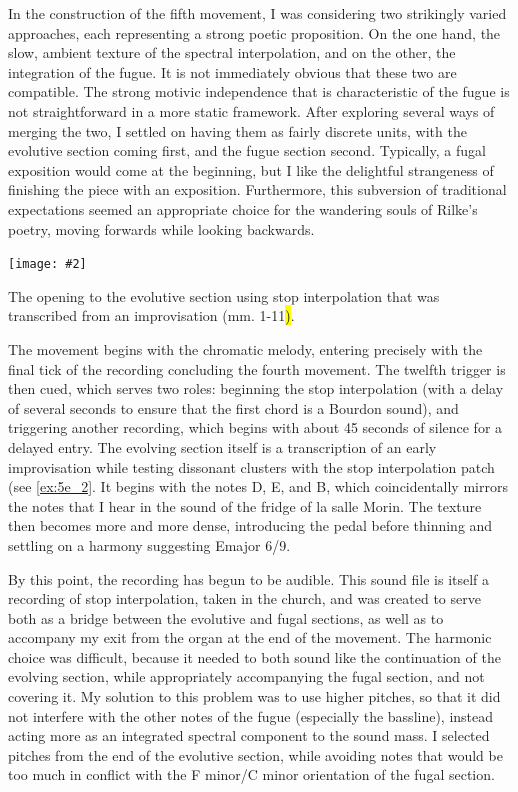 \documentclass[12pt,twoside,maitrise]{dms_ks}
\newcommand{\customincludeexamples}[4][]{%
    \begin{example}[H]
        \centering
        \texttt{[image: \#2]}
        \caption{#4}
	\label{#3} 
    \end{example}
}
\theoremstyle{definition}
\begin{document}
{{In the construction of the fifth movement, I was considering two strikingly varied approaches, each representing a strong poetic proposition. 
On the one hand, the slow, ambient texture of the spectral interpolation, and on the other, the integration of the fugue. 
It is not immediately obvious that these two are compatible.
The strong motivic independence that is characteristic of the fugue is not straightforward in a more static framework.
After exploring several ways of merging the two, I settled on having them as fairly discrete units, with the evolutive section coming first, and the fugue section second. 
Typically, a fugal exposition would come at the beginning, but I like the delightful strangeness of finishing the piece with an exposition. 
Furthermore, this subversion of traditional expectations seemed an appropriate choice for the wandering souls of Rilke's poetry, moving forwards while looking backwards. 

\customincludeexamples[width=\textwidth]{5e_2}{ex:5e_2}{The opening to the evolutive section using stop interpolation that was transcribed from an improvisation (mm. 1-11\hl{)}.}

The movement begins with the chromatic melody, entering precisely with the final tick of the recording concluding the fourth movement. The twelfth trigger is then cued, which serves two roles: beginning the stop interpolation (with a delay of several seconds to ensure that the first chord is a Bourdon sound), and triggering another recording, which begins with about 45 seconds of silence for a delayed entry. 
The evolving section itself is a transcription of an early improvisation while testing dissonant clusters with the stop interpolation patch (see \cref{ex:5e_2}.
It begins with the notes D, E\fl, and B\fl, which coincidentally mirrors the notes that I hear in the sound of the fridge of la salle Morin.
The texture then becomes more and more dense, introducing the pedal before thinning and settling on a harmony suggesting E\fl major 6/9. 

By this point, the recording has begun to be audible. 
This sound file is itself a recording of stop interpolation, taken in the church, and was created to serve both as a bridge between the evolutive and fugal sections, as well as to accompany my exit from the organ at the end of the movement. 
The harmonic choice was difficult, because it needed to both sound like the continuation of the evolving section, while appropriately accompanying the fugal section, and not covering it. 
My solution to this problem was to use higher pitches, so that it did not interfere with the other notes of the fugue (especially the bassline), instead acting more as an integrated spectral component to the sound mass. 
I selected pitches from the end of the evolutive section, while avoiding notes that would be too much in conflict with the F minor/C minor orientation of the fugal section.

}}
\end{document}
